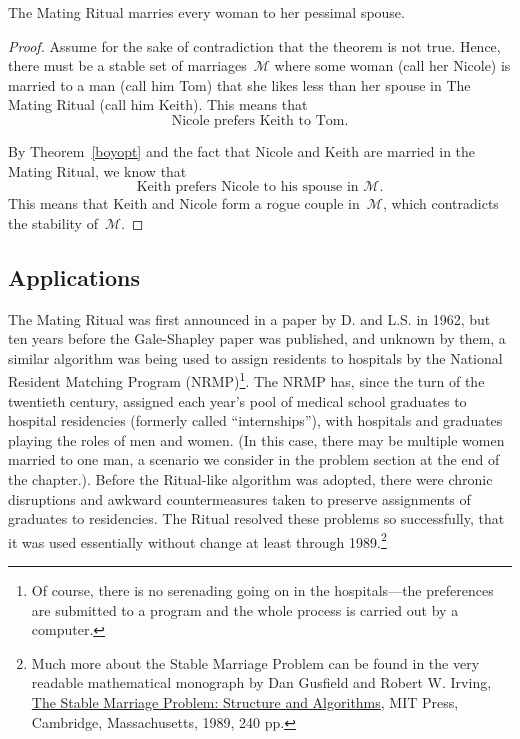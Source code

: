 \begin{theorem}
The Mating Ritual marries every woman to her pessimal spouse.
\end{theorem}

\begin{proof}
Assume for the sake of contradiction that the theorem is not true.
Hence, there must be a stable set of marriages~$\mathcal{M}$ where some
woman (call her Nicole) is married to a man (call him Tom) that she
likes less than her spouse in The Mating Ritual (call him Keith).
This means that
\begin{equation}
\text{Nicole prefers Keith to Tom.} \tag{+}
\end{equation}

By Theorem~\ref{boyopt} and the fact that Nicole and Keith are married
in the Mating Ritual, we know that 
\begin{equation}\tag{++}
\text{Keith prefers Nicole to his spouse in~$\mathcal{M}$.}
\end{equation}
This means that Keith and Nicole form a rogue couple in~$\mathcal{M}$,
which contradicts the stability of~$\mathcal{M}$.
\end{proof}

\subsection{Applications}

The Mating Ritual was first announced in a paper by D.  and
L.S.  in 1962, but ten years before the Gale-Shapley
paper was published, and unknown by them, a similar algorithm was
being used to assign residents to hospitals by the National Resident
Matching Program (NRMP)\footnote{Of course, there is no serenading
  going on in the hospitals---the preferences are submitted to a
  program and the whole process is carried out by a computer.}.  The
NRMP has, since the turn of the twentieth century, assigned each
year's pool of medical school graduates to hospital residencies
(formerly called ``internships''), with hospitals and graduates playing
the roles of men and women.  (In this case, there may be multiple
women married to one man, a scenario we consider in the problem
section at the end of the chapter.).  Before the Ritual-like algorithm
was adopted, there were chronic disruptions and awkward
countermeasures taken to preserve assignments of graduates to
residencies.  The Ritual resolved these problems so successfully, that
it was used essentially without change at least through
1989.\footnote{Much more about the Stable Marriage Problem can be
  found in the very readable mathematical monograph by Dan Gusfield
  and Robert W. Irving,
  \href{http://mitpress.mit.edu/catalog/item/default.asp?ttype=2&tid=7676}{The
    Stable Marriage Problem: Structure and Algorithms}, MIT Press,
  Cambridge, Massachusetts, 1989, 240 pp.}

